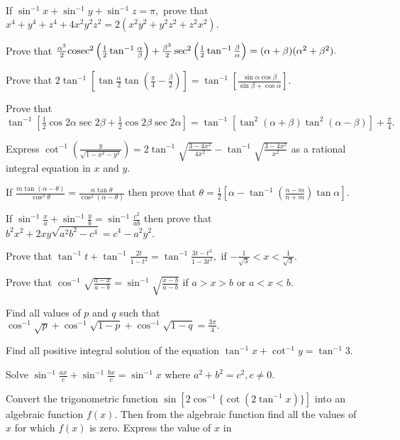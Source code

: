 \item If $\sin^{-1}x + \sin^{-1}y + \sin^{-1}z = \pi,$ prove that $x^4 + y^4 + z^4 + 4x^2y^2z^2 = 2(x^2y^2 + y^2z^2 +
     z^2x^2).$
\item Prove that $\frac{\alpha^3}{2}\rm cosec^2\left(\frac{1}{2}\tan^{-1}\frac{\alpha}{\beta}\right) +
     \frac{\beta^3}{2}\sec^2\left(\frac{1}{2}\tan^{-1}\frac{\beta}{\alpha}\right) = (\alpha + \beta)(\alpha^2 + \beta^2).$
\item Prove that $2\tan^{-1}\left[\tan\frac{\alpha}{2}\tan\left(\frac{\pi}{4} - \frac{\beta}{2}\right)\right] =
     \tan^{-1}\left[\frac{\sin\alpha\cos\beta}{\sin\beta + \cos\alpha}\right].$
\item Prove that $\tan^{-1}\left[\frac{1}{2}\cos2\alpha\sec2\beta + \frac{1}{2}\cos2\beta\sec2\alpha\right] = \tan^{-1}[\tan^2(\alpha +
     \beta)\tan^2(\alpha -\beta)] + \frac{\pi}{4}.$
\item Express $\cot^{-1}\left(\frac{y}{\sqrt{1 - x^2 - y^2}}\right) = 2\tan^{-1}\sqrt{\frac{3 - 4x^2}{4x^2}} -
     \tan^{-1}\sqrt{\frac{3 - 4x^2}{x^2}}$ as a rational integral equation in $x$ and $y.$
\item If $\frac{m\tan(\alpha - \theta)}{\cos^2\theta} = \frac{n\tan\theta}{\cos^2(\alpha - \theta)}$ then prove that
     $\theta = \frac{1}{2}\left[\alpha - \tan^{-1}\left(\frac{n - m}{n + m}\right)\tan\alpha\right].$
\item If $\sin^{-1}\frac{x}{a} + \sin^{-1}\frac{y}{b} = \sin^{-1}\frac{c^2}{ab}$ then prove that $b^2x^2 +
     2xy\sqrt{a^2b^2 - c^4} = c^4 - a^2y^2.$
\item Prove that $\tan^{-1}t + \tan^{-1}\frac{2t}{1 - t^2} = \tan^{-1}\frac{3t - t^3}{1 - 3t^2},$ if
     $-\frac{1}{\sqrt{3}} < x < \frac{1}{\sqrt{3}}.$
\item Prove that $\cos^{-1}\sqrt{\frac{a - x}{a - b}} = \sin^{-1}\sqrt{\frac{x - b}{a - b}}$ if $a > x> b$ or $a <
     x < b.$
\item Find all values of $p$ and $q$ such that $\cos^{-1}\sqrt{p} + \cos^{-1}\sqrt{1 - p} + \cos^{-1}\sqrt{1 - q}
     = \frac{3\pi}{4}.$
\item Find all positive integral solution of the equation $\tan^{-1}x + \cot^{-1}y = \tan^{-1}3.$
\item Solve $\sin^{-1}\frac{ax}{c} + \sin^{-1}\frac{bx}{c} = \sin^{-1}x$ where $a^2 + b^2 = c^2, c\neq 0.$
\item Convert the trigonometric function $\sin[2\cos^{-1}\{\cot(2\tan^{-1}x)\}]$ into an algebraic function $f(x).$ Then
     from the algebraic function find all the values of $x$ for which $f(x)$ is zero. Express the value of $x$ in
